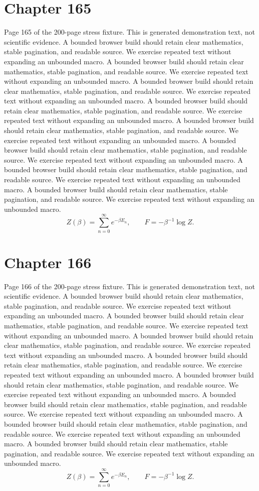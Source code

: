 \documentclass[11pt]{article}
\begin{document}
\section*{Chapter 165}
Page 165 of the 200-page stress fixture. This is generated demonstration text, not scientific evidence.
A bounded browser build should retain clear mathematics, stable pagination, and readable source. We exercise repeated text without expanding an unbounded macro.
A bounded browser build should retain clear mathematics, stable pagination, and readable source. We exercise repeated text without expanding an unbounded macro.
A bounded browser build should retain clear mathematics, stable pagination, and readable source. We exercise repeated text without expanding an unbounded macro.
A bounded browser build should retain clear mathematics, stable pagination, and readable source. We exercise repeated text without expanding an unbounded macro.
A bounded browser build should retain clear mathematics, stable pagination, and readable source. We exercise repeated text without expanding an unbounded macro.
A bounded browser build should retain clear mathematics, stable pagination, and readable source. We exercise repeated text without expanding an unbounded macro.
A bounded browser build should retain clear mathematics, stable pagination, and readable source. We exercise repeated text without expanding an unbounded macro.
A bounded browser build should retain clear mathematics, stable pagination, and readable source. We exercise repeated text without expanding an unbounded macro.
\[Z(\beta)=\sum_{n=0}^{\infty}e^{-\beta E_n},\qquad F=-\beta^{-1}\log Z.\]
\newpage
\section*{Chapter 166}
Page 166 of the 200-page stress fixture. This is generated demonstration text, not scientific evidence.
A bounded browser build should retain clear mathematics, stable pagination, and readable source. We exercise repeated text without expanding an unbounded macro.
A bounded browser build should retain clear mathematics, stable pagination, and readable source. We exercise repeated text without expanding an unbounded macro.
A bounded browser build should retain clear mathematics, stable pagination, and readable source. We exercise repeated text without expanding an unbounded macro.
A bounded browser build should retain clear mathematics, stable pagination, and readable source. We exercise repeated text without expanding an unbounded macro.
A bounded browser build should retain clear mathematics, stable pagination, and readable source. We exercise repeated text without expanding an unbounded macro.
A bounded browser build should retain clear mathematics, stable pagination, and readable source. We exercise repeated text without expanding an unbounded macro.
A bounded browser build should retain clear mathematics, stable pagination, and readable source. We exercise repeated text without expanding an unbounded macro.
A bounded browser build should retain clear mathematics, stable pagination, and readable source. We exercise repeated text without expanding an unbounded macro.
\[Z(\beta)=\sum_{n=0}^{\infty}e^{-\beta E_n},\qquad F=-\beta^{-1}\log Z.\]
\newpage
\end{document}
